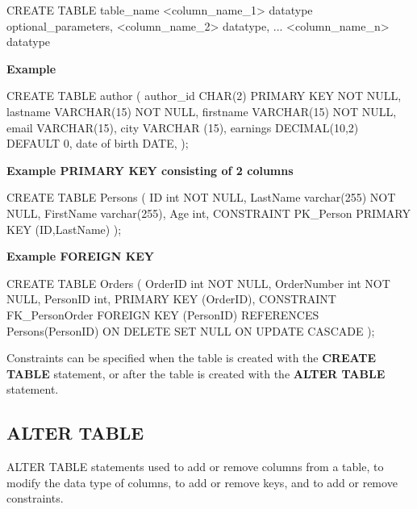 \documentclass{article}
\begin{document}
\begin{sqlcode}
    CREATE TABLE table_name
    {
        <column_name_1> datatype optional_parameters,
        <column_name_2> datatype, 
        ...
        <column_name_n> datatype
    }
\end{sqlcode}

\begin{large}
    \textbf{Example}
\end{large}

\begin{sqlcode}
    CREATE TABLE author
    (
        author_id CHAR(2) PRIMARY KEY NOT NULL,
        lastname VARCHAR(15) NOT NULL,
        firstname VARCHAR(15) NOT NULL,
        email VARCHAR(15),
        city VARCHAR (15),
        earnings DECIMAL(10,2) DEFAULT 0,
        date of birth DATE,
    );
\end{sqlcode}

\begin{large}
    \textbf{Example PRIMARY KEY consisting of 2 columns}
\end{large}

\begin{sqlcode}
    CREATE TABLE Persons (
    ID int NOT NULL,
    LastName varchar(255) NOT NULL,
    FirstName varchar(255),
    Age int,
    CONSTRAINT PK_Person PRIMARY KEY (ID,LastName)
    );
\end{sqlcode}

\begin{large}
    \textbf{Example FOREIGN KEY}
\end{large}

\begin{sqlcode}
    CREATE TABLE Orders (
    OrderID int NOT NULL,
    OrderNumber int NOT NULL,
    PersonID int,
    PRIMARY KEY (OrderID),
    CONSTRAINT FK_PersonOrder FOREIGN KEY (PersonID)
    REFERENCES Persons(PersonID) ON DELETE SET NULL ON UPDATE CASCADE
    );
\end{sqlcode}

Constraints can be specified when the table is created with the \textbf{CREATE TABLE} statement, or after the table is created with the \textbf{ALTER TABLE} statement.

\subsection{ALTER TABLE}

ALTER TABLE statements used to add or remove columns from a table, to modify the data type of columns, to add or remove keys, and to add or remove constraints.
\end{document}
